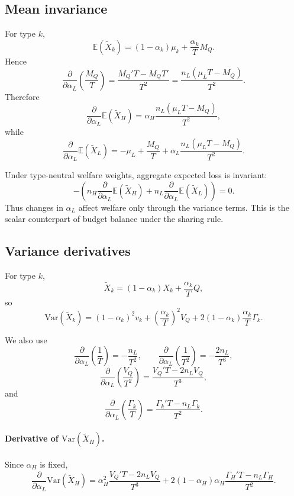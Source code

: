 \documentclass[a4paper,12pt]{article}
\theoremstyle{definition}
\theoremstyle{remark}
\newcommand{\E}{\mathbb{E}}
\newcommand{\Var}{\mathrm{Var}}
\newcommand{\1}{\mathbf{1}}
\begin{document}
\subsection{Mean invariance}
\label{app:alphaL-mean}

For type \(k\),
\[
\E(\tilde X_k)=(1-\alpha_k)\mu_k+\frac{\alpha_k}{T}M_Q.
\]
Hence
\[
\frac{\partial}{\partial \alpha_L}\left(\frac{M_Q}{T}\right)
=
\frac{M_Q'T-M_QT'}{T^2}
=
\frac{n_L(\mu_LT-M_Q)}{T^2}.
\]
Therefore
\[
\frac{\partial}{\partial \alpha_L}\E(\tilde X_H)
=
\alpha_H\frac{n_L(\mu_LT-M_Q)}{T^2},
\]
while
\[
\frac{\partial}{\partial \alpha_L}\E(\tilde X_L)
=
-\mu_L+\frac{M_Q}{T}
+\alpha_L\frac{n_L(\mu_LT-M_Q)}{T^2}.
\]

Under type-neutral welfare weights, aggregate expected loss is invariant:
\[
-\left(
n_H\frac{\partial}{\partial \alpha_L}\E(\tilde X_H)
+
n_L\frac{\partial}{\partial \alpha_L}\E(\tilde X_L)
\right)=0.
\]
Thus changes in \(\alpha_L\) affect welfare only through the variance terms.
This is the scalar counterpart of budget balance under the sharing rule.

\subsection{Variance derivatives}
\label{app:alphaL-var}

For type \(k\),
\[
\tilde X_k=(1-\alpha_k)X_k+\frac{\alpha_k}{T}Q,
\]
so
\begin{equation}
\Var(\tilde X_k)
=
(1-\alpha_k)^2v_k
+
\left(\frac{\alpha_k}{T}\right)^2V_Q
+
2(1-\alpha_k)\frac{\alpha_k}{T}\Gamma_k.
\label{eq:app-var-general}
\end{equation}

We also use
\[
\frac{\partial}{\partial \alpha_L}\left(\frac{1}{T}\right)
=
-\frac{n_L}{T^2},
\qquad
\frac{\partial}{\partial \alpha_L}\left(\frac{1}{T^2}\right)
=
-\frac{2n_L}{T^3},
\]
\begin{equation}
\frac{\partial}{\partial \alpha_L}\left(\frac{V_Q}{T^2}\right)
=
\frac{V_Q'T-2n_LV_Q}{T^3},
\label{eq:app-D1}
\end{equation}
and
\begin{equation}
\frac{\partial}{\partial \alpha_L}\left(\frac{\Gamma_k}{T}\right)
=
\frac{\Gamma_k'T-n_L\Gamma_k}{T^2}.
\label{eq:app-D2}
\end{equation}

\paragraph{Derivative of \(\Var(\tilde X_H)\).}
Since \(\alpha_H\) is fixed,
\begin{equation}
\frac{\partial}{\partial \alpha_L}\Var(\tilde X_H)
=
\alpha_H^2\frac{V_Q'T-2n_LV_Q}{T^3}
+
2(1-\alpha_H)\alpha_H\frac{\Gamma_H'T-n_L\Gamma_H}{T^2}.
\label{eq:app-dVarH-raw}
\end{equation}
\end{document}
